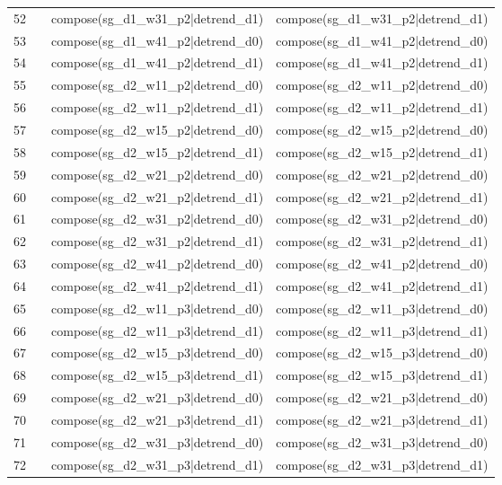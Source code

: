 \begin{tabular}{rlll}
52 &  & compose(sg\_d1\_w31\_p2|detrend\_d1) & compose(sg\_d1\_w31\_p2|detrend\_d1) \\
53 &  & compose(sg\_d1\_w41\_p2|detrend\_d0) & compose(sg\_d1\_w41\_p2|detrend\_d0) \\
54 &  & compose(sg\_d1\_w41\_p2|detrend\_d1) & compose(sg\_d1\_w41\_p2|detrend\_d1) \\
55 &  & compose(sg\_d2\_w11\_p2|detrend\_d0) & compose(sg\_d2\_w11\_p2|detrend\_d0) \\
56 &  & compose(sg\_d2\_w11\_p2|detrend\_d1) & compose(sg\_d2\_w11\_p2|detrend\_d1) \\
57 &  & compose(sg\_d2\_w15\_p2|detrend\_d0) & compose(sg\_d2\_w15\_p2|detrend\_d0) \\
58 &  & compose(sg\_d2\_w15\_p2|detrend\_d1) & compose(sg\_d2\_w15\_p2|detrend\_d1) \\
59 &  & compose(sg\_d2\_w21\_p2|detrend\_d0) & compose(sg\_d2\_w21\_p2|detrend\_d0) \\
60 &  & compose(sg\_d2\_w21\_p2|detrend\_d1) & compose(sg\_d2\_w21\_p2|detrend\_d1) \\
61 &  & compose(sg\_d2\_w31\_p2|detrend\_d0) & compose(sg\_d2\_w31\_p2|detrend\_d0) \\
62 &  & compose(sg\_d2\_w31\_p2|detrend\_d1) & compose(sg\_d2\_w31\_p2|detrend\_d1) \\
63 &  & compose(sg\_d2\_w41\_p2|detrend\_d0) & compose(sg\_d2\_w41\_p2|detrend\_d0) \\
64 &  & compose(sg\_d2\_w41\_p2|detrend\_d1) & compose(sg\_d2\_w41\_p2|detrend\_d1) \\
65 &  & compose(sg\_d2\_w11\_p3|detrend\_d0) & compose(sg\_d2\_w11\_p3|detrend\_d0) \\
66 &  & compose(sg\_d2\_w11\_p3|detrend\_d1) & compose(sg\_d2\_w11\_p3|detrend\_d1) \\
67 &  & compose(sg\_d2\_w15\_p3|detrend\_d0) & compose(sg\_d2\_w15\_p3|detrend\_d0) \\
68 &  & compose(sg\_d2\_w15\_p3|detrend\_d1) & compose(sg\_d2\_w15\_p3|detrend\_d1) \\
69 &  & compose(sg\_d2\_w21\_p3|detrend\_d0) & compose(sg\_d2\_w21\_p3|detrend\_d0) \\
70 &  & compose(sg\_d2\_w21\_p3|detrend\_d1) & compose(sg\_d2\_w21\_p3|detrend\_d1) \\
71 &  & compose(sg\_d2\_w31\_p3|detrend\_d0) & compose(sg\_d2\_w31\_p3|detrend\_d0) \\
72 &  & compose(sg\_d2\_w31\_p3|detrend\_d1) & compose(sg\_d2\_w31\_p3|detrend\_d1) \\

\end{tabular}
